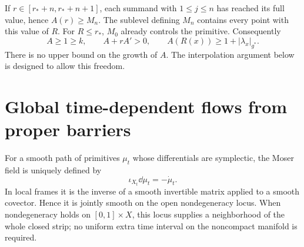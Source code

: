 If $r\in[r_*+n,r_*+n+1]$, each summand with $1\le j\le n$
has reached its full value, hence $A(r)\ge M_n$.
The sublevel defining $M_n$ contains every point with this value
of $R$. For $R\le r_*$, $M_0$ already controls the primitive.
Consequently
\begin{equation}\label{eq:Aproperties}
 A\ge1\ge k,\qquad A+rA'>0,\qquad
 A(R(x))\ge1+|\lambda_x|_{g^*}.
\end{equation}
There is no upper bound on the growth of $A$.
The interpolation argument below is designed to allow this freedom.

\section{Global time-dependent flows from proper barriers}
For a smooth path of primitives $\mu_t$ whose differentials are
symplectic, the Moser field is uniquely defined by
\begin{equation}\label{eq:moser}
 \iota_{X_t}\dd\mu_t=-\dot\mu_t .
\end{equation}
In local frames it is the inverse of a smooth invertible matrix
applied to a smooth covector. Hence it is jointly smooth on the
open nondegeneracy locus. When nondegeneracy holds on $[0,1]\times X$,
this locus supplies a neighborhood of the whole closed strip;
no uniform extra time interval on the noncompact manifold is
required.

